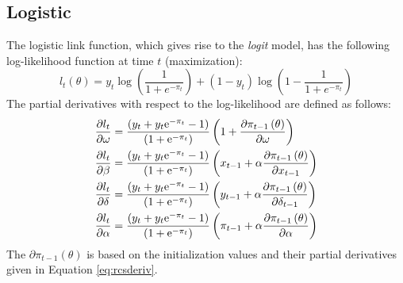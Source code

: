 \subsection{Logistic}
The logistic link function, which gives rise to the \emph{logit} model, has the following log-likelihood function at time $t$ (maximization):
\begin{equation}
{l_t}\left( \theta  \right) = {y_t}\log \left( {\frac{1}
{{1 + {e^{ - {\pi _t}}}}}} \right) + \left( {1 - {y_t}} \right)\log \left( {1 - \frac{1}
{{1 + {e^{ - {\pi _t}}}}}} \right)
\end{equation}
The partial derivatives with respect to the log-likelihood are defined as follows:
\begin{equation}
\begin{gathered}
  \frac{{\partial {l_t}}}
{{\partial \omega }} = \frac{{\left( {{y_t} + {y_t}{{\text{e}}^{ - {\pi _t}}} - 1} \right)}}
{{\left( {1 + {{\text{e}}^{ - {\pi _t}}}} \right)}}\left( {1 + \frac{{\partial {\pi _{t - 1}}\left( \theta  \right)}}
{{\partial \omega }}} \right) \hfill \\
  \frac{{\partial {l_t}}}
{{\partial \beta }} = \frac{{\left( {{y_t} + {y_t}{{\text{e}}^{ - {\pi _t}}} - 1} \right)}}
{{\left( {1 + {{\text{e}}^{ - {\pi _t}}}} \right)}}\left( {{x_{t - 1}} + \alpha \frac{{\partial {\pi _{t - 1}}\left( \theta  \right)}}
{{\partial {x_{t - 1}}}}} \right) \hfill \\
  \frac{{\partial {l_t}}}
{{\partial \delta }} = \frac{{\left( {{y_t} + {y_t}{{\text{e}}^{ - {\pi _t}}} - 1} \right)}}
{{\left( {1 + {{\text{e}}^{ - {\pi _t}}}} \right)}}\left( {{y_{t - 1}} + \alpha \frac{{\partial {\pi _{t - 1}}\left( \theta  \right)}}
{{\partial {\delta _{t - 1}}}}} \right) \hfill \\
  \frac{{\partial {l_t}}}
{{\partial \alpha }} = \frac{{\left( {{y_t} + {y_t}{{\text{e}}^{ - {\pi _t}}} - 1} \right)}}
{{\left( {1 + {{\text{e}}^{ - {\pi _t}}}} \right)}}\left( {{\pi _{t - 1}} + \alpha \frac{{\partial {\pi _{t - 1}}\left( \theta  \right)}}
{{\partial \alpha }}} \right) \hfill \\
\end{gathered}
\end{equation}
The ${\partial {\pi _{t - 1}}\left( \theta  \right)}$ is based on the initialization values and their partial derivatives given in Equation \ref{eq:rcsderiv}.

